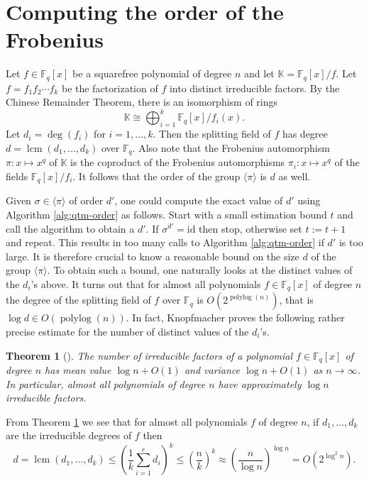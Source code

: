\documentclass{article}
\theoremstyle{plain}
\newtheorem{theorem}{Theorem}
\theoremstyle{definition}
\newcommand{\lrang}[1]{\langle#1\rangle}
\DeclareMathOperator{\lcm}{lcm} %
\DeclareMathOperator{\polylog}{polylog}
\def\K{\ensuremath{\mathbb{K}}}
\def\F{\ensuremath{\mathbb{F}}}
\begin{document}

\section{Computing the order of the Frobenius}

Let $f \in \F_q[x]$ be a squarefree polynomial of degree $n$ and let $\K = \F_q[x] / f$. Let $f = 
f_1f_2 \cdots f_k$ be the factorization of $f$ into distinct irreducible factors. By the Chinese 
Remainder Theorem, there is an isomorphism of rings
\begin{equation}
\label{equ:crt}
	\K \cong \bigoplus_{i = 1}^k \F_q[x] / f_i(x).
\end{equation}
Let $d_i = \deg(f_i)$ for $i = 1, \dots, k$. Then the splitting field of $f$ has degree $d = 
\lcm(d_1, \dots, d_k)$ over $\F_q$. Also note that the Frobenius automorphism $\pi: x \mapsto x^q$ 
of $\K$ is the coproduct of the Frobenius automorphisms $\pi_i: x \mapsto x^q$ of the fields 
$\F_q[x] / f_i$. It follows that the order of the group $\lrang{\pi}$ is $d$ as well.

Given $\sigma \in \lrang{\pi}$ of order $d'$, one could compute the exact value of $d'$ using 
Algorithm \ref{alg:qtm-order} as follows. Start with a small estimation bound $t$ and call the 
algorithm to obtain a $d'$. If $\sigma^{d'} = \text{id}$ then stop, otherwise set $t := t + 1$ and 
repeat. This results in too many calls to Algorithm \ref{alg:qtm-order} if $d'$ is too large. It is 
therefore crucial to know a reasonable bound on the size $d$ of the group $\lrang{\pi}$. To obtain 
such a bound, one naturally looks at the distinct values of the $d_i$'s above. It turns out that 
for almost all polynomials $f \in \F_q[x]$ of degree $n$ the degree of the splitting field of $f$ 
over $\F_q$ is $O(2^{\polylog(n)})$, that is $\log d \in O(\polylog(n))$. In fact, Knopfmacher 
proves the following rather precise estimate for the number of distinct values of the $d_i$'s.
\begin{theorem}[\cite{knopfmacher1999degrees}]
	\label{thm:d-mean}
	The number of irreducible factors of a polynomial $f \in \F_q[x]$ of degree $n$ has mean value 
	$\log n + O(1)$ and variance $\log n + O(1)$ as $n \rightarrow \infty$. In particular, almost 
	all polynomials of degree $n$ have approximately $\log n$ irreducible factors.
\end{theorem}
From Theorem \ref{thm:d-mean} we see that for almost all polynomials $f$ of degree $n$, if $d_1, 
\dots, d_k$ are the irreducible degrees of $f$ then 
\begin{equation}
	\label{equ:ag-mean}
	d = \lcm(d_1, \dots, d_k) \le \left( \frac{1}{k} \sum_{i = 1}^rd_i \right)^k \le \left( 
	\frac{n}{k} \right)^k \approx \left( \frac{n}{\log n} \right)^{\log n} = O(2^{\log^2n}).
\end{equation}
\end{document}
